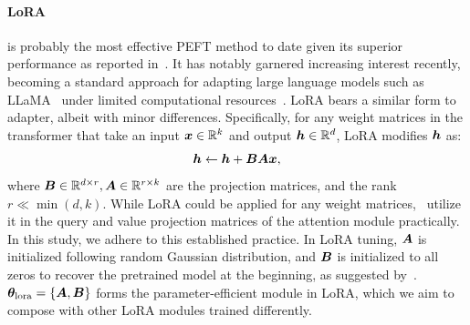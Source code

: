 \paragraph{LoRA}
is probably the most effective PEFT method to date given its superior performance as reported in~\citet{hu2021lora}. 
It has notably garnered increasing interest recently, becoming a standard approach for adapting large language models such as LLaMA~\citep{touvron2023llama} under limited computational resources~\citep{alpacalora}. 
LoRA bears a similar form to adapter, albeit with minor differences. Specifically, for any weight matrices in the transformer that take an input ${\bm{x}} \in {\mathbb{R}}^k$ and output ${\bm{h}} \in {\mathbb{R}}^d$, LoRA modifies ${\bm{h}}$ as:
\begin{equation}
    \label{eq:lora}
    {\bm{h}} \leftarrow {\bm{h}} + {\bm{B}}{\bm{A}}{\bm{x}},
\end{equation}
where ${\bm{B}} \in {\mathbb{R}}^{d\times r}, {\bm{A}} \in {\mathbb{R}}^{r\times k}$ are the projection matrices, and the rank $r \ll \min(d, k)$.
While LoRA could be applied for any weight matrices,~\citet{hu2021lora} utilize it in the query and value projection matrices of the attention module practically. In this study, we adhere to this established practice. 
In LoRA tuning, ${\bm{A}}$ is initialized following random Gaussian distribution, and ${\bm{B}}$ is initialized to all zeros to recover the pretrained model at the beginning, as suggested by~\citet{hu2021lora}. 
${\bm{\theta}}_{\text{lora}}=\{{\bm{A}}, {\bm{B}}\}$ forms the parameter-efficient module in LoRA, which we aim to compose with other LoRA modules trained differently.




